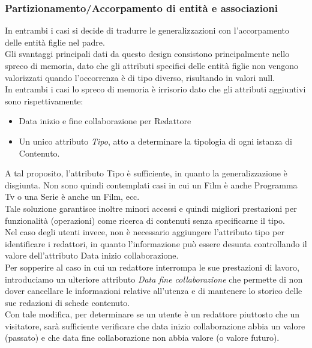 \documentclass[a4paper]{article}
\begin{document}
\subsubsection{Partizionamento/Accorpamento di entità e associazioni}
In entrambi i casi si decide di tradurre le generalizzazioni con l'accorpamento delle entità figlie 
nel padre.\\
Gli svantaggi principali dati da questo design consistono principalmente nello spreco di memoria, dato che 
gli attributi specifici delle entità figlie non vengono valorizzati quando l'occorrenza è di tipo diverso, risultando 
in valori null.\\
In entrambi i casi lo spreco di memoria è irrisorio dato che gli attributi aggiuntivi sono rispettivamente:\\
\begin{itemize}
  \item Data inizio e fine collaborazione per Redattore \\
\item Un unico attributo \emph{Tipo}, atto a determinare la tipologia di ogni istanza di Contenuto.\\
\end{itemize}
A tal proposito, l'attributo Tipo è sufficiente, in quanto la generalizzazione è disgiunta. Non sono quindi
contemplati casi in cui un Film è anche Programma Tv o una Serie è anche un Film, ecc.\\
Tale soluzione garantisce inoltre minori accessi e quindi migliori prestazioni per funzionalità (operazioni)
come ricerca di contenuti senza specificarne il tipo.\\
Nel caso degli utenti invece, non è necessario aggiungere l'attributo tipo per identificare i redattori, in quanto l'informazione
può essere desunta controllando il valore dell'attributo Data inizio collaborazione. \\
Per sopperire al caso in cui un redattore interrompa le sue prestazioni di lavoro, introduciamo un ulteriore attributo \emph{Data fine collaborazione}
che permette di non dover cancellare le informazioni relative all'utenza e di mantenere lo storico delle sue redazioni di 
schede contenuto.\\
Con tale modifica, per determinare se un utente è un redattore piuttosto che un visitatore, sarà sufficiente verificare che 
data inizio collaborazione abbia un valore (passato) e che data fine collaborazione non abbia valore (o valore futuro). \\
\end{document}
